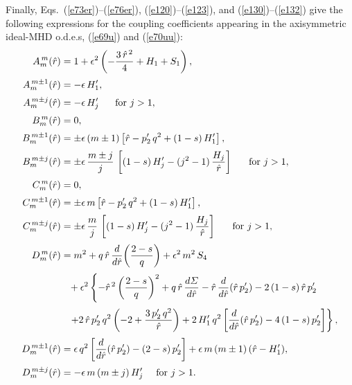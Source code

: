 \documentclass[12pt,prb,aps]{revtex4-1}
\begin{document}
Finally, Eqs.~(\ref{e73er})--(\ref{e76er}), (\ref{e120})--(\ref{e123}), and (\ref{e130})--(\ref{e132}) give the following expressions for the coupling coefficients appearing
in the axisymmetric ideal-MHD o.d.e.s, (\ref{e69u}) and (\ref{e70uu}): 
\begin{align}
A_m^{\,m}(\hat{r}) &= 1 + \epsilon^2\left(-\frac{3\,\hat{r}^{\,2}}{4} + H_1+S_1\right),\\[0.5ex]
A_m^{\,m\pm 1}(\hat{r}) &= - \epsilon\,H_1',\\[0.5ex]
A_m^{\,m\pm j}(\hat{r}) &= -\epsilon\,H_j'~~~~~\mbox{for $j>1$},\\[0.5ex]
B_m^{\,m}(\hat{r}) &= 0,\\[0.5ex]
B_m^{\,m\pm 1}(\hat{r}) &= \pm \epsilon\,(m\pm 1)\left[\hat{r}-p_2'\,q^2+(1-s)\,H_1'\right],\\[0.5ex]
B_m^{\,m\pm j}(\hat{r}) &= \pm\epsilon\,\frac{m\pm j}{j}\,\left[(1-s)\,H_j'- (j^2-1)\,\frac{H_j}{\hat{r}}\right]~~~~~\mbox{for $j>1$},\\[0.5ex]
C_m^{\,m}(\hat{r}) &= 0,\\[0.5ex]
C_m^{\,m\pm 1}(\hat{r}) &= \pm \epsilon\,m\left[\hat{r}-p_2'\,q^2+(1-s)\,H_1'\right],\\[0.5ex]
C_m^{\,m\pm j}(\hat{r}) &= \pm\epsilon\,\frac{m}{j}\,\left[(1-s)\,H_j'- (j^2-1)\,\frac{H_j}{\hat{r}}\right]~~~~~\mbox{for $j>1$},\\[0.5ex]
D_m^{\,m}(\hat{r}) &= m^2 + q\,\hat{r}\,\frac{d}{d\hat{r}}\!\left(\frac{2-s}{q}\right) +\epsilon^2\,m^2\,S_4\nonumber\\[0.5ex]
&\phantom{=}+\epsilon^2\left\{-\hat{r}^{\,2}\left(\frac{2-s}{q}\right)^2+q\,\hat{r}\,\frac{d{\mit\Sigma}}{d\hat{r}}- \hat{r}\,\frac{d}{d\hat{r}}(\hat{r}\,p_2') -2\,(1-s)\,\hat{r}\,p_2'
\right.\nonumber\\[0.5ex]
&\phantom{=}\left.+2\,\hat{r}\,p_2'\,q^2\left(-2 + \frac{3\,p_2'\,q^2}{\hat{r}}\right) + 2\,H_1'\,q^2\left[\frac{d}{d\hat{r}}(\hat{r}\,p_2')-4\,(1-s)\,p_2'\right]\right\},\\[0.5ex]
D_m^{\,m\pm 1}(\hat{r}) &=\epsilon\,q^2\left[\frac{d}{d\hat{r}}(\hat{r}\,p_2') - (2-s)\,p_2'\right] + \epsilon\,m\,(m\pm 1)\,(\hat{r}-H_1'),\\[0.5ex]
D_m^{\,m\pm j}(\hat{r}) &= -\epsilon\,m\,(m\pm j)\,H_j'~~~~\mbox{for $j>1$}.
\end{align}
\end{document}
